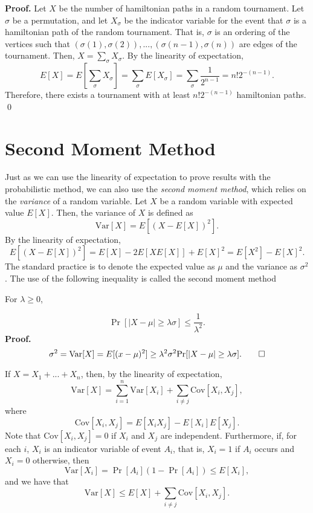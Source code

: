 \textbf{Proof. } Let $X$ be the number of hamiltonian paths in a random tournament. Let $\sigma$ be a permutation, and let $X_\sigma$ be the indicator variable for the event that $\sigma$ is a hamiltonian path of the random tournament. That is, $\sigma$ is an ordering of the vertices such that $(\sigma(1), \sigma(2)), ..., (\sigma(n - 1), \sigma(n))$ are edges of the tournament. Then, $X = \sum_{\sigma} X_\sigma$. By the linearity of expectation,
\[E[X] = E\left[\sum_{\sigma} X_\sigma\right] = \sum_{\sigma} E[X_\sigma] = \sum_{\sigma} \frac{1}{2^{n - 1}} = n!2^{-(n - 1)}.\]
Therefore, there exists a tournament with at least $n!2^{-(n - 1)}$ hamiltonian paths. \qed

\section{Second Moment Method}\label{sec:probmet:secondmoment}

Just as we can use the linearity of expectation to prove results with the probabilistic method, we can also use the \textit{second moment method}, which relies on the \textit{variance} of a random variable. Let $X$ be a random variable with expected value $E[X]$. Then, the variance of $X$ is defined as
\[\text{Var}[X] = E[(X - E[X])^2].\]
By the linearity of expectation, 
\[E[(X - E[X])^2] = E[X] - 2E[XE[X]] + E[X]^2 = E[X^2] - E[X]^2.\]
The standard practice is to denote the expected value as $\mu$ and the variance as $\sigma^2$. The use of the following inequality is called the second moment method \par

\begin{theorem}\label{thm:probmet:chebyschev}\cite{alon2016probabilistic}
    For $\lambda \geq 0$,
\end{theorem}
\[\Pr[|X - \mu| \geq \lambda \sigma] \leq \frac{1}{\lambda^2}.\]
\textbf{Proof. } 
\[\sigma^2 = \text{Var}[X] = E[(x - \mu)^2] \geq \lambda^2\sigma^2 \Pr[|X - \mu| \geq \lambda \sigma]. \qed\]

If $X = X_1 + ... + X_n$, then, by the linearity of expectation,
\[\text{Var}[X] = \sum_{i = 1}^{n}\text{Var}[X_i] + \sum_{i \neq j}\text{Cov}[X_i, X_j],\]
where 
\[\text{Cov}[X_i, X_j] = E[X_iX_j] - E[X_i]E[X_j].\] 
Note that $\text{Cov}[X_i, X_j] = 0$ if $X_i$ and $X_j$ are independent. Furthermore, if, for each $i$, $X_i$ is an indicator variable of event $A_i$, that is, $X_i = 1$ if $A_i$ occurs and $X_i = 0$ otherwise, then
\[\text{Var}[X_i] = \Pr[A_i](1 - \Pr[A_i]) \leq E[X_i],\]
and we have that
\begin{equation}
    \text{Var}[X] \leq E[X] + \sum_{i \neq j} \text{Cov}[X_i, X_j].
\end{equation}

